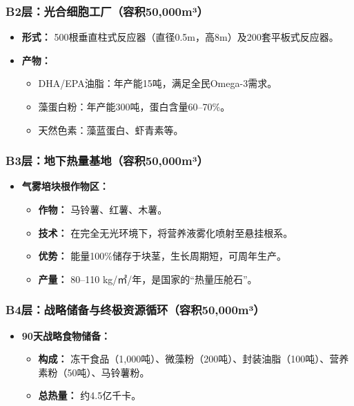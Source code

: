 \subsubsection{B2层：光合细胞工厂（容积50,000m³）}\label{b2ux5c42ux5149ux5408ux7ec6ux80deux5de5ux5382ux5bb9ux79ef50000muxb3}

\begin{itemize}
\item
  \textbf{形式：} 500根垂直柱式反应器（直径0.5m，高8m）及200套平板式反应器。
\item
  \textbf{产物：}

  \begin{itemize}
  \item
    DHA/EPA油脂：年产能15吨，满足全民Omega-3需求。
  \item
    藻蛋白粉：年产能300吨，蛋白含量60--70\%。
  \item
    天然色素：藻蓝蛋白、虾青素等。
  \end{itemize}
\end{itemize}

\subsubsection{B3层：地下热量基地（容积50,000m³）}\label{b3ux5c42ux5730ux4e0bux70edux91cfux57faux5730ux5bb9ux79ef50000muxb3}

\begin{itemize}
\item
  \textbf{气雾培块根作物区：}

  \begin{itemize}
  \item
    \textbf{作物：} 马铃薯、红薯、木薯。
  \item
    \textbf{技术：} 在完全无光环境下，将营养液雾化喷射至悬挂根系。
  \item
    \textbf{优势：} 能量100\%储存于块茎，生长周期短，可周年生产。
  \item
    \textbf{产量：} 80--110 kg/㎡/年，是国家的``热量压舱石''。
  \end{itemize}
\end{itemize}

\subsubsection{B4层：战略储备与终极资源循环（容积50,000m³）}\label{b4ux5c42ux6218ux7565ux50a8ux5907ux4e0eux7ec8ux6781ux8d44ux6e90ux5faaux73afux5bb9ux79ef50000muxb3}

\begin{itemize}
\item
  \textbf{90天战略食物储备：}

  \begin{itemize}
  \item
    \textbf{构成：} 冻干食品（1,000吨）、微藻粉（200吨）、封装油脂（100吨）、营养素粉（50吨）、马铃薯粉。
  \item
    \textbf{总热量：} 约4.5亿千卡。
  \end{itemize}
\end{itemize}

